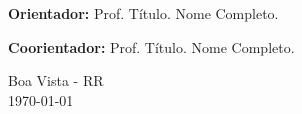 \begin{titlepage}
\begin{center}
        \begin{flushright}
            \parbox{9cm}{\setlength{\parindent}{0pt}
            \textbf{Orientador:} Prof. Título. Nome Completo.
            }
        \end{flushright}

        \begin{flushright}
            \parbox{9cm}{\setlength{\parindent}{0pt}
            \textbf{Coorientador:} Prof. Título. Nome Completo.
            }
        \end{flushright}

        \vfill

        {\large Boa Vista - RR\\
        \today}
    \end{center}
\end{titlepage}
